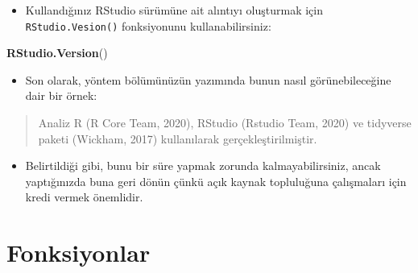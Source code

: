 \documentclass[
  oneside]{book}
\newenvironment{Shaded}{\begin{snugshade}}{\end{snugshade}}
\newcommand{\FunctionTok}[1]{\textcolor[rgb]{0.13,0.29,0.53}{\textbf{#1}}}
\newcommand{\NormalTok}[1]{#1}
\providecommand{\tightlist}{%
  \setlength{\itemsep}{0pt}\setlength{\parskip}{0pt}}
\begin{document}
\begin{itemize}
\tightlist
\item
  Kullandığınız RStudio sürümüne ait alıntıyı oluşturmak için \texttt{RStudio.Vesion()} fonksiyonunu kullanabilirsiniz:
\end{itemize}

\begin{Shaded}
\begin{Highlighting}[]
\FunctionTok{RStudio.Version}\NormalTok{()}
\end{Highlighting}
\end{Shaded}

\begin{itemize}
\tightlist
\item
  Son olarak, yöntem bölümünüzün yazımında bunun nasıl görünebileceğine dair bir örnek:
\end{itemize}

\begin{quote}
Analiz R (R Core Team, 2020), RStudio (Rstudio Team, 2020) ve tidyverse paketi (Wickham, 2017) kullanılarak gerçekleştirilmiştir.
\end{quote}

\begin{itemize}
\tightlist
\item
  Belirtildiği gibi, bunu bir süre yapmak zorunda kalmayabilirsiniz, ancak yaptığınızda buna geri dönün çünkü açık kaynak topluluğuna çalışmaları için kredi vermek önemlidir.
\end{itemize}

\hypertarget{fonksiyonlar}{%
\chapter{Fonksiyonlar}\label{fonksiyonlar}}
\end{document}
